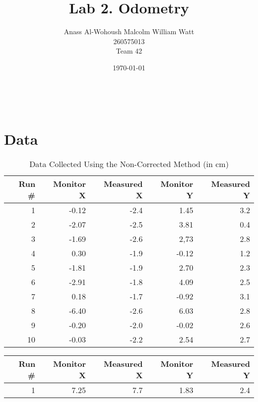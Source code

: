 \documentclass[letterpaper,12pt]{article}
\begin{document}
\title{Lab 2. Odometry}
\date{\today}
\author{Anass Al-Wohoush \quad \quad Malcolm William Watt \\ 260575013 \quad \quad \quad \quad \quad \quad {}\\ Team 42}
\maketitle
\mbox{}\\

\section{Data}{
\begin{table}[h]
\centering
    \begin{tabular}{|r|r|r|r|r|}
    \hline
    Run \# & Monitor X & Measured X & Monitor Y & Measured Y \\ \hline
    1     & -0.12     & -2.4       & 1.45      & 3.2        \\ \hline
    2     & -2.07     & -2.5       & 3.81      & 0.4        \\ \hline
    3     & -1.69     & -2.6       & 2,73      & 2.8        \\ \hline
    4     & 0.30      & -1.9       & -0.12     & 1.2        \\ \hline
    5     & -1.81     & -1.9       & 2.70      & 2.3        \\ \hline
    6     & -2.91     & -1.8       & 4.09      & 2.5        \\ \hline
    7     & 0.18      & -1.7       & -0.92     & 3.1        \\ \hline
    8     & -6.40     & -2.6       & 6.03      & 2.8        \\ \hline
    9     & -0.20     & -2.0       & -0.02     & 2.6        \\ \hline
    10    & -0.03     & -2.2       & 2.54      & 2.7        \\ \hline
    \end{tabular}
    \caption {Data Collected Using the Non-Corrected Method (in cm)}
\end{table}
\clearpage
\begin{table}[h]
\centering
    \begin{tabular}{|r|r|r|r|r|}
    \hline
    Run \# & Monitor X & Measured X & Monitor Y & Measured Y \\ \hline
    1     & 7.25      & 7.7        & 1.83      & 2.4        \\ \hline

\end{tabular}
\end{table}}
\end{document}
